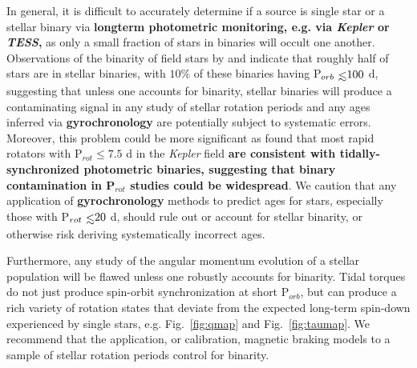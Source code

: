 \documentclass[twocolumn]{aastex61}
\def\lsim{~\rlap{$<$}{\lower 1.0ex\hbox{$\sim$}}}
\newcommand{\xxx}[1]{{\textbf{#1}}}
\newcommand{\kepler}[0]{\textit{Kepler}\xspace}
\begin{document}
In general, it is difficult to accurately determine if a source is single star or a stellar binary via \xxx{longterm photometric monitoring, e.g. via \kepler or \textit{TESS},} as only a small fraction of stars in binaries will occult one another. Observations of the binarity of field stars by \citet{Raghavan2010} and \citet{Duchene2013} indicate that roughly half of stars are in stellar binaries, with $10\%$ of these binaries having P$_{orb} \lsim 100$ d, suggesting that unless one accounts for binarity, stellar binaries will produce a contaminating signal in any study of stellar rotation periods and any ages inferred via \xxx{gyrochronology} are potentially subject to systematic errors.  Moreover, this problem could be more significant as \citet{Simonian2018} found that most rapid rotators with P$_{rot} \leq 7.5$ d in the \kepler field \xxx{are consistent with tidally-synchronized photometric binaries, suggesting that binary contamination in P$_{rot}$ studies could be widespread}. We caution that any application of \xxx{gyrochronology} methods to predict ages for stars, especially those with P$_{rot} \lsim 20$ d, should rule out or account for stellar binarity, or otherwise risk deriving systematically incorrect ages.

Furthermore, any study of the angular momentum evolution of a stellar population will be flawed unless one robustly accounts for binarity.  Tidal torques do not just produce spin-orbit synchronization at short P$_{orb}$, but can produce a rich variety of rotation states that deviate from the expected long-term spin-down experienced by single stars, e.g. Fig.~\ref{fig:qmap} and Fig.~\ref{fig:taumap}. We recommend that the application, or calibration, magnetic braking models to a sample of stellar rotation periods control for binarity.   



\end{document}

